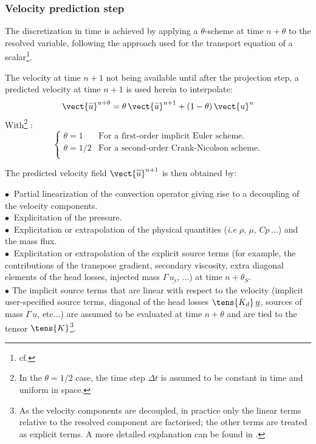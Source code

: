 \subsubsection*{\bf Velocity prediction step}
The discretization in time is achieved by applying a $\theta$-scheme
at time $n+\theta$ to the resolved variable, following the approach used
for the transport equation of a scalar\footnote{cf. }.

The velocity at time $n+1$ not being available until after the projection
step, a predicted velocity at time $n+1$ is used herein to interpolate:
\begin{equation}
\label{Base_Navstv_thetaschema}
\vect{\widetilde{u}}^{n+\theta} = \theta\, {\vect{\widetilde{u}}}^{n+1}+(1-\theta)\, \vect{u}^{n}
\end{equation}
With\footnote{In the $\theta = 1/2$ case, the time step $\Delta t$ is assumed
to be constant in time and uniform in space.} :
\begin{equation}
\left\{
\begin{array}{ll}
\theta = 1   & \text{For a first-order implicit Euler scheme.}\\
\theta = 1/2 & \text{For a second-order Crank-Nicolson scheme.}\\
\end{array}
\right.
\end{equation}

The predicted velocity field ${\vect{\widetilde{u}}^{n+1}}$ is then
obtained by:

$\bullet\ $ Partial linearization of the convection operator giving rise to a
decoupling of the velocity components.\\
$\bullet\ $ Explicitation of the pressure.\\
$\bullet\ $ Explicitation or extrapolation of the physical quantities ({\it i.e}
$\rho,\,\mu,\,Cp\,...$) and the mass flux.\\
$\bullet\ $ Explicitation or extrapolation of the explicit source terms (for example, the contributions of the transpose gradient, secondary viscosity, extra diagonal elements of the head losses, injected mass $\Gamma\,\underline{u_i}$, ...) at time $n+\theta_{S}$. \\
$\bullet$ The implicit source terms that are linear with respect to the velocity
(implicit user-specified source terms, diagonal of the head losses
$\tens{K_d}\,\underline{u}$, sources of mass $\Gamma\,\underline{u}$, etc...)
are assumed to be evaluated at time $n+\theta$ and are tied to the tensor
$\tens{K}$\footnote{As the velocity components are decoupled, in practice only
the linear terms relative to the resolved component are factorised; the other terms are treated as explicit terms. A more detailed explanation can be found in .}.\\

